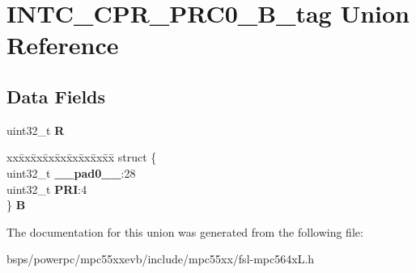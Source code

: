 \hypertarget{unionINTC__CPR__PRC0__32B__tag}{}\section{I\+N\+T\+C\+\_\+\+C\+P\+R\+\_\+\+P\+R\+C0\+\_\+B\+\_\+tag Union Reference}
\label{unionINTC__CPR__PRC0__32B__tag}
\subsection*{Data Fields}
\begin{DoxyCompactItemize}
\item 
\mbox{\label{unionINTC__CPR__PRC0__32B__tag_a2ad02421a2344735380de4ae904939c8}} 
uint32\+\_\+t {\bfseries R}
\item 
\mbox{\label{unionINTC__CPR__PRC0__32B__tag_a3b71d4a28064bce722f546a3012b6f44}} 
\begin{tabbing}
xx\=xx\=xx\=xx\=xx\=xx\=xx\=xx\=xx\=\kill
struct \{\\
\>uint32\_t {\bfseries \_\_pad0\_\_}:28\\
\>uint32\_t {\bfseries PRI}:4\\
\} {\bfseries B}\\

\end{tabbing}\end{DoxyCompactItemize}


The documentation for this union was generated from the following file\+:\begin{DoxyCompactItemize}
\item 
bsps/powerpc/mpc55xxevb/include/mpc55xx/fsl-\/mpc564x\+L.\+h\end{DoxyCompactItemize}
